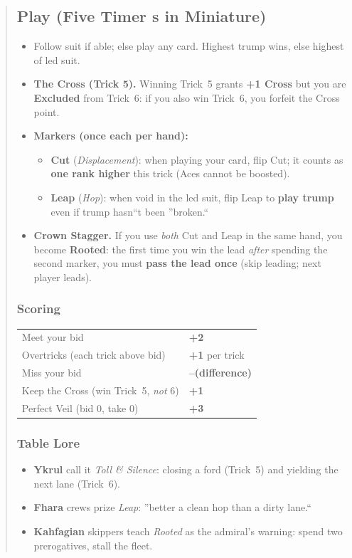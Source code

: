 \documentclass[11pt]{article}
\begin{document}
\begin{quote}
\subsection*{Play (Five Timer s in Miniature)}
\begin{itemize}[leftmargin=1.2em,itemsep=0.25em]
  \item Follow suit if able; else play any card. Highest trump wins, else highest of led suit.
  \item \textbf{The Cross (Trick 5).} Winning Trick~5 grants \textbf{+1 Cross} but you are \textbf{Excluded} from Trick~6: if you also win Trick~6, you forfeit the Cross point.
  \item \textbf{Markers (once each per hand):}
  \begin{itemize}[leftmargin=1.2em,itemsep=0.15em]
    \item \textbf{Cut} (\emph{Displacement}): when playing your card, flip Cut; it counts as \textbf{one rank higher} this trick (Aces cannot be boosted).
    \item \textbf{Leap} (\emph{Hop}): when void in the led suit, flip Leap to \textbf{play trump} even if trump hasn``t been ''broken.``
  \end{itemize}
  \item \textbf{Crown Stagger.} If you use \emph{both} Cut and Leap in the same hand, you become \textbf{Rooted}: the first time you win the lead \emph{after} spending the second marker, you must \textbf{pass the lead once} (skip leading; next player leads).
\end{itemize}

\subsubsection*{Scoring}
\noindent\begin{tabularx}{\linewidth}{@{}l >{\raggedleft\arraybackslash}X@{}}
\toprule
Meet your bid & \textbf{+2} \\
Overtricks (each trick above bid) & \textbf{+1} per trick \\
Miss your bid & \textbf{--(difference)} \\
Keep the Cross (win Trick~5, \emph{not} 6) & \textbf{+1} \\
Perfect Veil (bid 0, take 0) & \textbf{+3} \\
\bottomrule
\end{tabularx}

\subsubsection*{Table Lore}
\begin{itemize}[leftmargin=1.2em,itemsep=0.25em]
  \item \textbf{Ykrul} call it \emph{Toll \& Silence}: closing a ford (Trick~5) and yielding the next lane (Trick~6).
  \item \textbf{Fhara} crews prize \emph{Leap}: ''better a clean hop than a dirty lane.``
  \item \textbf{Kahfagian} skippers teach \emph{Rooted} as the admiral's warning: spend two prerogatives, stall the fleet.
\end{itemize}


\end{quote}
\end{document}
